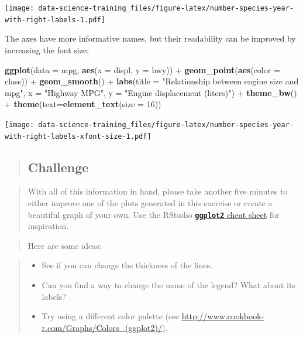 \documentclass[]{book}
\newenvironment{Shaded}{\begin{snugshade}}{\end{snugshade}}
\newcommand{\KeywordTok}[1]{\textcolor[rgb]{0.13,0.29,0.53}{\textbf{{#1}}}}
\newcommand{\DataTypeTok}[1]{\textcolor[rgb]{0.13,0.29,0.53}{{#1}}}
\newcommand{\DecValTok}[1]{\textcolor[rgb]{0.00,0.00,0.81}{{#1}}}
\newcommand{\StringTok}[1]{\textcolor[rgb]{0.31,0.60,0.02}{{#1}}}
\newcommand{\NormalTok}[1]{{#1}}
\providecommand{\tightlist}{%
  \setlength{\itemsep}{0pt}\setlength{\parskip}{0pt}}
\theoremstyle{definition}
\theoremstyle{definition}
\theoremstyle{definition}
\theoremstyle{remark}
\begin{document}
\texttt{[image: data-science-training\_files/figure-latex/number-species-year-with-right-labels-1.pdf]}

The axes have more informative names, but their readability can be
improved by increasing the font size:

\begin{Shaded}
\begin{Highlighting}[]
\KeywordTok{ggplot}\NormalTok{(}\DataTypeTok{data =} \NormalTok{mpg, }\KeywordTok{aes}\NormalTok{(}\DataTypeTok{x =} \NormalTok{displ, }\DataTypeTok{y =} \NormalTok{hwy)) +}\StringTok{ }
\StringTok{  }\KeywordTok{geom_point}\NormalTok{(}\KeywordTok{aes}\NormalTok{(}\DataTypeTok{color =} \NormalTok{class)) +}\StringTok{ }
\StringTok{  }\KeywordTok{geom_smooth}\NormalTok{() +}
\StringTok{  }\KeywordTok{labs}\NormalTok{(}\DataTypeTok{title =} \StringTok{"Relationship between engine size and mpg"}\NormalTok{,}
         \DataTypeTok{x =} \StringTok{"Highway MPG"}\NormalTok{,}
         \DataTypeTok{y =} \StringTok{"Engine displacement (liters)"}\NormalTok{) +}
\StringTok{  }\KeywordTok{theme_bw}\NormalTok{() +}
\StringTok{  }\KeywordTok{theme}\NormalTok{(}\DataTypeTok{text=}\KeywordTok{element_text}\NormalTok{(}\DataTypeTok{size =} \DecValTok{16}\NormalTok{))}
\end{Highlighting}
\end{Shaded}

\texttt{[image: data-science-training\_files/figure-latex/number-species-year-with-right-labels-xfont-size-1.pdf]}

\begin{quote}
\subsection{Challenge}\label{challenge}
\end{quote}

\begin{quote}
With all of this information in hand, please take another five minutes
to either improve one of the plots generated in this exercise or create
a beautiful graph of your own. Use the RStudio
\href{https://www.rstudio.com/wp-content/uploads/2016/11/ggplot2-cheatsheet-2.1.pdf}{\textbf{\texttt{ggplot2}}
cheat sheet} for inspiration.
\end{quote}

\begin{quote}
Here are some ideas:
\end{quote}

\begin{quote}
\begin{itemize}
\tightlist
\item
  See if you can change the thickness of the lines.
\item
  Can you find a way to change the name of the legend? What about its
  labels?
\item
  Try using a different color palette (see
  \url{http://www.cookbook-r.com/Graphs/Colors_(ggplot2)/}).
\end{itemize}
\end{quote}
\end{document}
